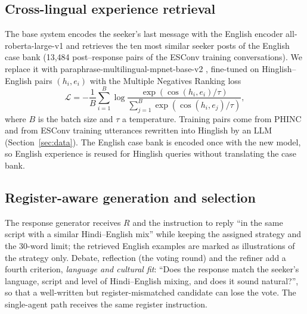 \documentclass[conference]{IEEEtran}
\begin{document}
\subsection{Cross-lingual experience retrieval}
The base system encodes the seeker's last message with the English encoder all-roberta-large-v1
and retrieves the ten most similar seeker posts of the English case bank (13,484 post--response
pairs of the ESConv training conversations). We replace it with
paraphrase-multilingual-mpnet-base-v2 \cite{reimers2020multilingual}, fine-tuned on
Hinglish--English pairs $(h_i, e_i)$ with the Multiple Negatives Ranking loss
\cite{henderson2017smartreply}
\begin{equation}
\mathcal{L} = -\frac{1}{B}\sum_{i=1}^{B}\log\frac{\exp(\cos(h_i,e_i)/\tau)}{\sum_{j=1}^{B}\exp(\cos(h_i,e_j)/\tau)},
\end{equation}
where $B$ is the batch size and $\tau$ a temperature. Training pairs come from PHINC
\cite{srivastava2020phinc} and from ESConv training utterances rewritten into Hinglish by an LLM
(Section~\ref{sec:data}). The English case bank is encoded once with the new model, so English
experience is reused for Hinglish queries without translating the case bank.

\subsection{Register-aware generation and selection}
The response generator receives $R$ and the instruction to reply ``in the same script with a
similar Hindi--English mix'' while keeping the assigned strategy and the 30-word limit; the
retrieved English examples are marked as illustrations of the strategy only. Debate, reflection
(the voting round) and the refiner add a fourth criterion, \emph{language and cultural fit}:
``Does the response match the seeker's language, script and level of Hindi--English mixing, and
does it sound natural?'', so that a well-written but register-mismatched candidate can lose the
vote. The single-agent path receives the same register instruction.
\end{document}
